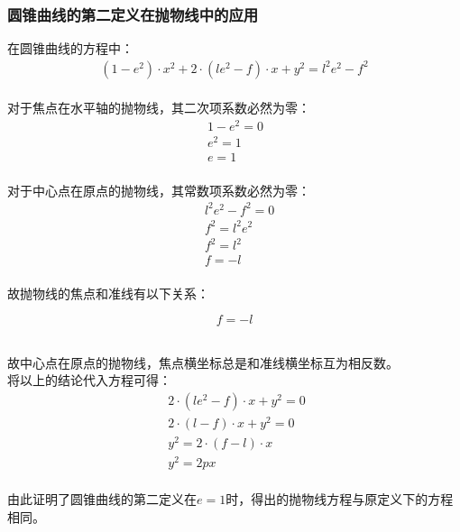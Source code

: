 \documentclass[UTF8]{ctexart}
\begin{document}
\subsubsection{圆锥曲线的第二定义在抛物线中的应用}
    \setcounter{equation}{0}
    在圆锥曲线的方程中：
    \begin{align}
        \left(1-e^2\right)\cdot x^2+2\cdot\left(le^2-f\right)\cdot x+y^2=l^2e^2-f^2
    \end{align}\\
    对于焦点在水平轴的抛物线，其二次项系数必然为零：\vspace{3pt}
    \begin{align}
        &1-e^2=0~~~\\[3mm]
        &e^2=1\\[3mm]
        &e=1
    \end{align}\\
    对于中心点在原点的抛物线，其常数项系数必然为零：\vspace{3pt}
    \begin{align}
        &l^2e^2-f^2=0\\[3mm]
        &f^2=l^2e^2\\[3mm]
        &f^2=l^2\\[3mm]
        &f=-l
    \end{align}\\
    故抛物线的焦点和准线有以下关系：
    \begin{large}
        \begin{equation*}
            f=-l
        \end{equation*}
    \end{large}\\
    故中心点在原点的抛物线，焦点横坐标总是和准线横坐标互为相反数。\\[10mm]
    将以上的结论代入方程可得：
    \begin{align}
        &2\cdot(le^2-f)\cdot x+y^2=0~~\\[3mm]
        &2\cdot(l-f)\cdot x+y^2=0\\[3mm]
        &y^2=2\cdot(f-l)\cdot x\\[3mm]
        &y^2=2px
    \end{align}\\
    由此证明了圆锥曲线的第二定义在$e=1$时，得出的抛物线方程与原定义下的方程相同。\\[3mm]
    
\newpage
\end{document}
